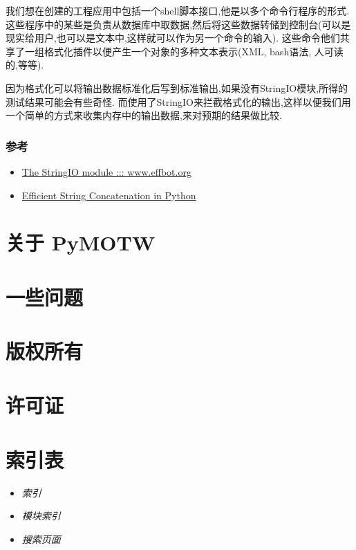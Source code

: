 \documentclass[letterpaper,10pt,english]{manual}
\begin{document}
我们想在创建的工程应用中包括一个shell脚本接口,他是以多个命令行程序的形式.这些程序中的某些是负责从数据库中取数据,然后将这些数据转储到控制台(可以是现实给用户,也可以是文本中,这样就可以作为另一个命令的输入). 这些命令他们共享了一组格式化插件以便产生一个对象的多种文本表示(XML, bash语法, 人可读的,等等).

因为格式化可以将输出数据标准化后写到标准输出,如果没有StringIO模块,所得的测试结果可能会有些奇怪. 而使用了StringIO来拦截格式化的输出,这样以便我们用一个简单的方式来收集内存中的输出数据,来对预期的结果做比较.


\subsection{参考}
\begin{itemize}
\item {} 
\href{http://effbot.org/librarybook/stringio.htm}{The StringIO module ::: www.effbot.org}

\item {} 
\href{http://www.skymind.com/\%7Eocrow/python\_string/}{Efficient String Concatenation in Python}

\end{itemize}

\resetcurrentobjects


\chapter{关于 PyMOTW}

\resetcurrentobjects


\chapter{一些问题}

\resetcurrentobjects


\chapter{版权所有}

\resetcurrentobjects


\chapter{许可证}


\chapter{索引表}
\begin{itemize}
\item {} 
\emph{索引}

\item {} 
\emph{模块索引}

\item {} 
\emph{搜索页面}

\end{itemize}


\renewcommand{\indexname}{Module Index}
\printmodindex
\renewcommand{\indexname}{Index}
\printindex
\end{document}
